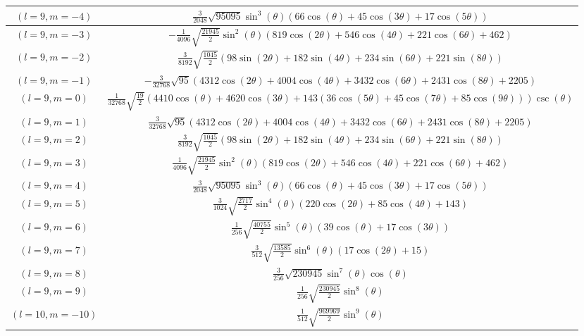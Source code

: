\begin{center}
\begin{longtable}{|c|c|}
$(l=9, m=-4)$ & $\frac{3}{2048} \sqrt{95095} \sin ^3(\theta ) (66 \cos (\theta )+45 \cos (3 \theta )+17 \cos (5 \theta ))$ \\ \hline
\rowcolor{gray!15}
$(l=9, m=-3)$ & $-\frac{1}{4096} \sqrt{\frac{21945}{2}} \sin ^2(\theta ) (819 \cos (2 \theta )+546 \cos (4 \theta )+221 \cos (6 \theta )+462)$ \\ \hline
$(l=9, m=-2)$ & $\frac{3}{8192} \sqrt{\frac{1045}{2}} (98 \sin (2 \theta )+182 \sin (4 \theta )+234 \sin (6 \theta )+221 \sin (8 \theta ))$ \\ \hline
\rowcolor{gray!15}
$(l=9, m=-1)$ & $-\frac{3}{32768} \sqrt{95} (4312 \cos (2 \theta )+4004 \cos (4 \theta )+3432 \cos (6 \theta )+2431 \cos (8 \theta )+2205)$ \\ \hline
$(l=9, m=0)$ & $\frac{1}{32768} \sqrt{\frac{19}{2}} (4410 \cos (\theta )+4620 \cos (3 \theta )+143 (36 \cos (5 \theta )+45 \cos (7 \theta )+85 \cos (9 \theta ))) \csc (\theta )$ \\ \hline
\rowcolor{gray!15}
$(l=9, m=1)$ & $\frac{3}{32768} \sqrt{95} (4312 \cos (2 \theta )+4004 \cos (4 \theta )+3432 \cos (6 \theta )+2431 \cos (8 \theta )+2205)$ \\ \hline
$(l=9, m=2)$ & $\frac{3}{8192} \sqrt{\frac{1045}{2}} (98 \sin (2 \theta )+182 \sin (4 \theta )+234 \sin (6 \theta )+221 \sin (8 \theta ))$ \\ \hline
\rowcolor{gray!15}
$(l=9, m=3)$ & $\frac{1}{4096} \sqrt{\frac{21945}{2}} \sin ^2(\theta ) (819 \cos (2 \theta )+546 \cos (4 \theta )+221 \cos (6 \theta )+462)$ \\ \hline
$(l=9, m=4)$ & $\frac{3}{2048} \sqrt{95095} \sin ^3(\theta ) (66 \cos (\theta )+45 \cos (3 \theta )+17 \cos (5 \theta ))$ \\ \hline
\rowcolor{gray!15}
$(l=9, m=5)$ & $\frac{3}{1024} \sqrt{\frac{2717}{2}} \sin ^4(\theta ) (220 \cos (2 \theta )+85 \cos (4 \theta )+143)$ \\ \hline
$(l=9, m=6)$ & $\frac{1}{256} \sqrt{\frac{40755}{2}} \sin ^5(\theta ) (39 \cos (\theta )+17 \cos (3 \theta ))$ \\ \hline
\rowcolor{gray!15}
$(l=9, m=7)$ & $\frac{3}{512} \sqrt{\frac{13585}{2}} \sin ^6(\theta ) (17 \cos (2 \theta )+15)$ \\ \hline
$(l=9, m=8)$ & $\frac{3}{256} \sqrt{230945} \sin ^7(\theta ) \cos (\theta )$ \\ \hline
\rowcolor{gray!15}
$(l=9, m=9)$ & $\frac{1}{256} \sqrt{\frac{230945}{2}} \sin ^8(\theta )$ \\ \hline
$(l=10, m=-10)$ & $\frac{1}{512} \sqrt{\frac{969969}{2}} \sin ^9(\theta )$ \\ \hline

\end{longtable}
\end{center}
